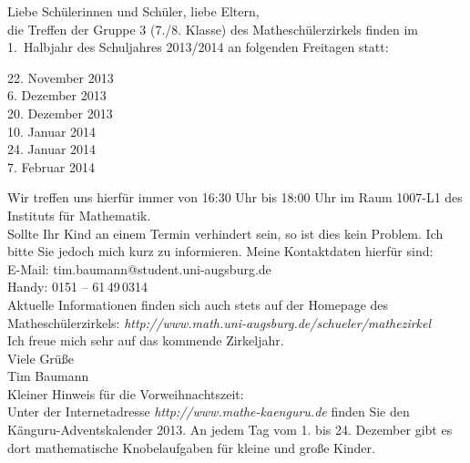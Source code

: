 \documentclass{infozettel}
\begin{document}
\renewcommand{\betreff}{Informationen zum Mathesch\"ulerzirkel der Universit\"at Augsburg\\ (7./8. Klasse -- Gruppe 3)}

\makeletterhead
Liebe Sch\"ulerinnen und Sch\"uler, liebe Eltern,\\[5pt]
die Treffen der Gruppe 3 (7./8. Klasse) des Mathesch\"ulerzirkels finden im 1.\ Halbjahr des Schuljahres 2013/2014 an folgenden Freitagen statt:
\begin{center}
22. November 2013\\
6. Dezember 2013\\
20. Dezember 2013\\
10. Januar 2014\\
24. Januar 2014\\
7. Februar 2014
\end{center}
Wir treffen uns hierf\"ur immer von 16:30 Uhr bis 18:00 Uhr im Raum 1007-L1 des Instituts f\"ur Mathematik.\\

Sollte Ihr Kind an 
einem Termin verhindert sein, so ist dies kein Problem. Ich bitte Sie jedoch mich kurz zu informieren. Meine Kontaktdaten hierf\"ur sind:\\
E-Mail: tim.baumann@student.uni-augsburg.de\\
Handy: 0151 -- 61\,49\,0314\\

Aktuelle Informationen finden sich auch stets auf der Homepage des Mathesch\"ulerzirkels:
\textsl{http:/\!/www.math.uni-augsburg.de/schueler/mathezirkel}\\

Ich freue mich sehr auf das kommende Zirkeljahr.\\
Viele Gr\"u\ss{}e\\[1.5cm]
Tim Baumann\\[1.1cm]


\footnotesize
Kleiner Hinweis f\"ur die Vorweihnachtszeit:\\
Unter der Internetadresse \textsl{http:/\!/www.mathe-kaenguru.de} finden Sie den K\"anguru-Adventskalender 2013. An jedem Tag vom 1. bis 24. Dezember 
gibt es dort mathematische Knobelaufgaben f\"ur kleine und gro\ss{}e Kinder. 
\end{document}
